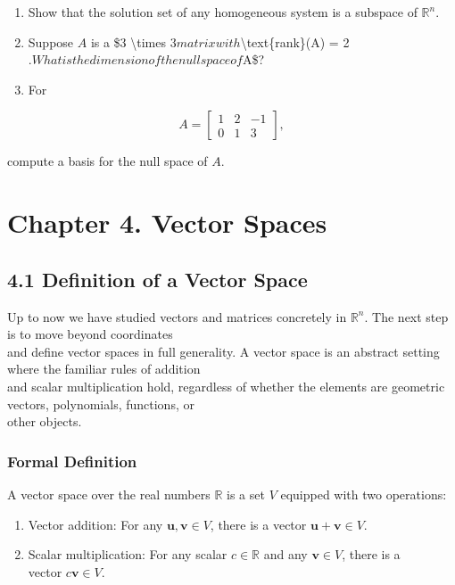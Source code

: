 \documentclass[
  12pt,
  a4paper,
]{article}
\let\oldsection\section
\renewcommand{\section}{\clearpage\oldsection}
\begin{document}
\begin{enumerate}
\def\labelenumi{\arabic{enumi}.}
\item
  Show that the solution set of any homogeneous system is a subspace of
  \(\mathbb{R}^n\).
\item
  Suppose \(A\) is a \$3 \textbackslash times
  3\( matrix with \)\textbackslash text\{rank\}(A) =
  2\(. What is the dimension of the null space of \)A\$?
\item
  For
\end{enumerate}

\[A = \begin{bmatrix} 1 & 2 & -1 \\ 0 & 1 & 3 \end{bmatrix},\]

compute a basis for the null space of \(A\).\\

\section{Chapter 4. Vector Spaces}\label{chapter-4-vector-spaces}

\subsection{4.1 Definition of a Vector
Space}\label{41-definition-of-a-vector-space}

Up to now we have studied vectors and matrices concretely in
\(\mathbb{R}^n\). The next step is to move beyond coordinates\\
and define vector spaces in full generality. A vector space is an
abstract setting where the familiar rules of addition\\
and scalar multiplication hold, regardless of whether the elements are
geometric vectors, polynomials, functions, or\\
other objects.

\subsubsection{Formal Definition}\label{formal-definition-2}

A vector space over the real numbers \(\mathbb{R}\) is a set \(V\)
equipped with two operations:

\begin{enumerate}
\def\labelenumi{\arabic{enumi}.}
\item
  Vector addition: For any \(\mathbf{u}, \mathbf{v} \in V\), there is a
  vector \(\mathbf{u} + \mathbf{v} \in V\).
\item
  Scalar multiplication: For any scalar \(c \in \mathbb{R}\) and any
  \(\mathbf{v} \in V\), there is a\\
  vector \(c\mathbf{v} \in V\).
\end{enumerate}
\end{document}

